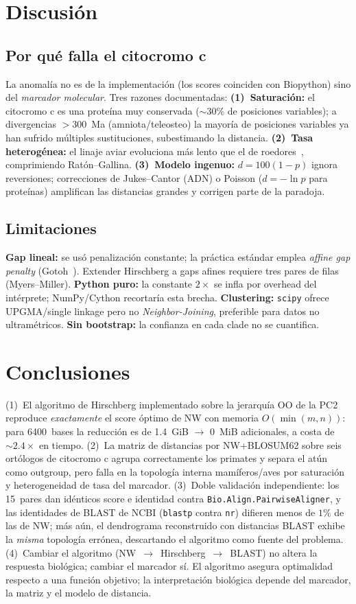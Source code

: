 \documentclass[11pt,a4paper]{article}
\begin{document}
\section{Discusi\'on}
\subsection{Por qu\'e falla el citocromo c}
La anomal\'ia no es de la implementaci\'on (los scores coinciden con Biopython) sino del \emph{marcador molecular}. Tres razones documentadas: \textbf{(1)~Saturaci\'on:} el citocromo c es una prote\'ina muy conservada ($\sim$30\% de posiciones variables); a divergencias $>$300~Ma (amniota/teleosteo) la mayor\'ia de posiciones variables ya han sufrido m\'ultiples sustituciones, subestimando la distancia. \textbf{(2)~Tasa heterog\'enea:} el linaje aviar evoluciona m\'as lento que el de roedores~\cite{dayhoff1978}, comprimiendo Rat\'on--Gallina. \textbf{(3)~Modelo ingenuo:} $d = 100(1-p)$ ignora reversiones; correcciones de Jukes--Cantor (ADN) o Poisson ($d = -\ln p$ para prote\'inas) amplifican las distancias grandes y corrigen parte de la paradoja.

\subsection{Limitaciones}
\textbf{Gap lineal:} se us\'o penalizaci\'on constante; la pr\'actica est\'andar emplea \emph{affine gap penalty} (Gotoh~\cite{gotoh1982}). Extender Hirschberg a gaps afines requiere tres pares de filas (Myers--Miller). \textbf{Python puro:} la constante $2\times$ se infla por overhead del int\'erprete; NumPy/Cython recortar\'ia esta brecha. \textbf{Clustering:} \texttt{scipy} ofrece UPGMA/single linkage pero no \emph{Neighbor-Joining}, preferible para datos no ultram\'etricos. \textbf{Sin bootstrap:} la confianza en cada clade no se cuantifica.

\section{Conclusiones}
(1)~El algoritmo de Hirschberg implementado sobre la jerarqu\'ia OO de la PC2 reproduce \emph{exactamente} el score \'optimo de NW con memoria $O(\min(m,n))$: para 6400~bases la reducci\'on es de 1.4~GiB $\to$ 0~MiB adicionales, a costa de $\sim 2.4\times$ en tiempo. (2)~La matriz de distancias por NW+BLOSUM62 sobre seis ort\'ologos de citocromo c agrupa correctamente los primates y separa el at\'un como outgroup, pero falla en la topolog\'ia interna mam\'iferos/aves por saturaci\'on y heterogeneidad de tasa del marcador. (3)~Doble validaci\'on independiente: los 15~pares dan id\'enticos score e identidad contra \texttt{Bio.Align.PairwiseAligner}, y las identidades de BLAST de NCBI (\texttt{blastp} contra \texttt{nr}) difieren menos de $1\%$ de las de NW; m\'as a\'un, el dendrograma reconstruido con distancias BLAST exhibe la \emph{misma} topolog\'ia err\'onea, descartando el algoritmo como fuente del problema. (4)~Cambiar el algoritmo (NW~$\to$~Hirschberg~$\to$~BLAST) no altera la respuesta biol\'ogica; cambiar el marcador s\'i. El algoritmo asegura optimalidad respecto a una funci\'on objetivo; la interpretaci\'on biol\'ogica depende del marcador, la matriz y el modelo de distancia.
\end{document}
